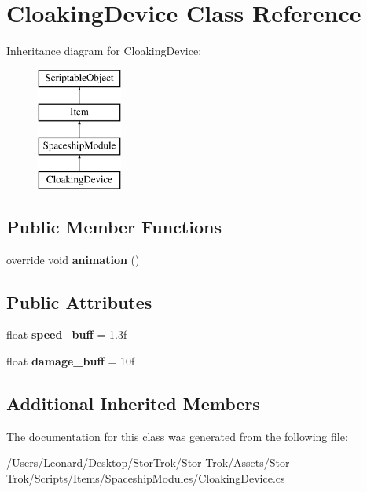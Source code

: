 \hypertarget{class_cloaking_device}{}\section{Cloaking\+Device Class Reference}
\label{class_cloaking_device}
Inheritance diagram for Cloaking\+Device\+:\begin{figure}[H]
\begin{center}
\leavevmode
\includegraphics[height=4.000000cm]{class_cloaking_device}
\end{center}
\end{figure}
\subsection*{Public Member Functions}
\begin{DoxyCompactItemize}
\item 
\mbox{\label{class_cloaking_device_a37211f77adc401c5abf08a5e5fcd9f05}} 
override void {\bfseries animation} ()
\end{DoxyCompactItemize}
\subsection*{Public Attributes}
\begin{DoxyCompactItemize}
\item 
\mbox{\label{class_cloaking_device_acc053a4955de25da2705a3362f568965}} 
float {\bfseries speed\+\_\+buff} = 1.\+3f
\item 
\mbox{\label{class_cloaking_device_ace548b4010af49cc83b18f859e501b8c}} 
float {\bfseries damage\+\_\+buff} = 10f
\end{DoxyCompactItemize}
\subsection*{Additional Inherited Members}


The documentation for this class was generated from the following file\+:\begin{DoxyCompactItemize}
\item 
/\+Users/\+Leonard/\+Desktop/\+Stor\+Trok/\+Stor Trok/\+Assets/\+Stor Trok/\+Scripts/\+Items/\+Spaceship\+Modules/Cloaking\+Device.\+cs\end{DoxyCompactItemize}
